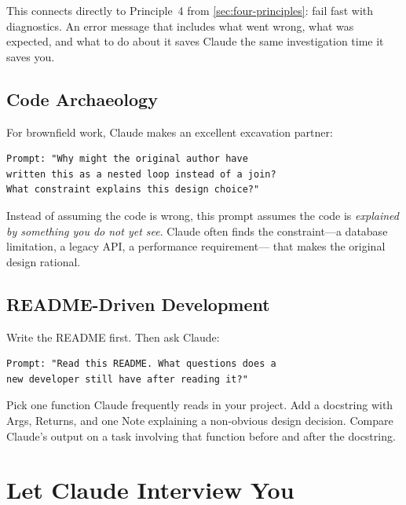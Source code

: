 This connects directly to Principle~4 from \cref{sec:four-principles}:
fail fast with diagnostics. An error message that includes what went wrong,
what was expected, and what to do about it saves Claude the same
investigation time it saves you.

\subsection{Code Archaeology}

For brownfield work, Claude makes an excellent excavation partner:

\begin{verbatim}
Prompt: "Why might the original author have
written this as a nested loop instead of a join?
What constraint explains this design choice?"
\end{verbatim}

Instead of assuming the code is wrong, this prompt assumes the code is
\emph{explained by something you do not yet see}. Claude often finds the
constraint---a database limitation, a legacy API, a performance requirement---
that makes the original design rational.

\subsection{README-Driven Development}

Write the README first. Then ask Claude:

\begin{verbatim}
Prompt: "Read this README. What questions does a
new developer still have after reading it?"
\end{verbatim}


\begin{trybox}
Pick one function Claude frequently reads in your project.
Add a docstring with Args, Returns, and one Note explaining a non-obvious
design decision. Compare Claude's output on a task involving that function
before and after the docstring.
\end{trybox}

\section{Let Claude Interview You}
\label{sec:interview}

